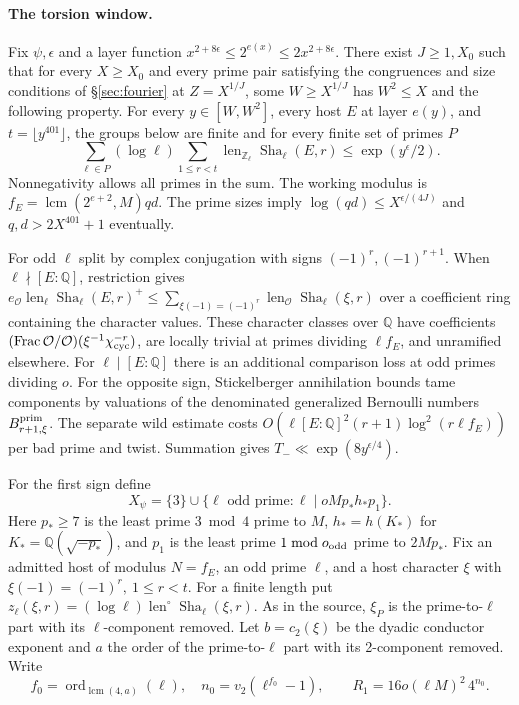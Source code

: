 \documentclass[letterpaper,11pt]{article}
\newcommand{\QQ}{\mathbb Q}
\newcommand{\ZZ}{\mathbb Z}
\newcommand{\Sha}{\operatorname{Sha}}
\newcommand{\len}{\operatorname{len}}
\newcommand{\ord}{\operatorname{ord}}
\begin{document}
\paragraph{The torsion window.}
Fix \(\psi,\epsilon\) and a layer function \(x^{2+8\epsilon}\le2^{e(x)}\le2x^{2+8\epsilon}\). There exist \(J\ge1,X_0\) such that for every \(X\ge X_0\) and every prime pair satisfying the congruences and size conditions of \S\ref{sec:fourier} at \(Z=X^{1/J}\), some \(W\ge X^{1/J}\) has \(W^2\le X\) and the following property. For every \(y\in[W,W^2]\), every host \(E\) at layer \(e(y)\), and \(t=\lfloor y^{401}\rfloor\), the groups below are finite and for every finite set of primes \(P\)
\begin{equation}\label{eq:sha}
 \sum_{\ell\in P}(\log\ell)\sum_{1\le r<t}\len_{\ZZ_\ell}\Sha_\ell(E,r)\le\exp(y^\epsilon/2).
\end{equation}
Nonnegativity allows all primes in the sum. The working modulus is \(f_E=\operatorname{lcm}(2^{e+2},M)qd\). The prime sizes imply \(\log(qd)\le X^{\epsilon/(4J)}\) and \(q,d>2X^{401}+1\) eventually.

For odd \(\ell\) split by complex conjugation with signs \((-1)^r,(-1)^{r+1}\). When \(\ell\nmid [E:\QQ]\), restriction gives
\(e_{\mathcal O}\len_\ell\Sha_\ell(E,r)^+\le\sum_{\xi(-1)=(-1)^r}\len_{\mathcal O}\Sha_\ell(\xi,r)\)
over a coefficient ring containing the character values. These character classes over \(\QQ\) have coefficients \((\operatorname{Frac}\mathcal O/\mathcal O)(\xi^{-1}\chi_{\rm cyc}^{-r})\), are locally trivial at primes dividing \(\ell f_E\), and unramified elsewhere. For \(\ell\mid[E:\QQ]\) there is an additional comparison loss at odd primes dividing \(o\). For the opposite sign, Stickelberger annihilation bounds tame components by valuations of the denominated generalized Bernoulli numbers \(B^{\rm prim}_{r+1,\xi}\). The separate wild estimate costs \(O(\ell[E:\QQ]^2(r+1)\log^2(r\ell f_E))\) per bad prime and twist. Summation gives \(T_-\ll\exp(8y^{\epsilon/4})\).

For the first sign define
\[
 X_\psi=\{3\}\cup\{\ell\text{ odd prime}:\ell\mid oMp_*h_*p_1\}.
\]
Here \(p_*\ge7\) is the least prime \(3\bmod4\) prime to \(M\), \(h_*=h(K_*)\) for \(K_*=\QQ(\sqrt{-p_*})\), and \(p_1\) is the least prime \(1\bmod o_{\rm odd}\) prime to \(2Mp_*\). Fix an admitted host of modulus \(N=f_E\), an odd prime \(\ell\), and a host character \(\xi\) with \(\xi(-1)=(-1)^r,\ 1\le r<t\). For a finite length put \(z_\ell(\xi,r)=(\log\ell)\len^\circ\Sha_\ell(\xi,r)\). As in the source, \(\xi_P\) is the prime-to-\(\ell\) part with its \(\ell\)-component removed. Let \(b=c_2(\xi)\) be the dyadic conductor exponent and \(a\) the order of the prime-to-\(\ell\) part with its 2-component removed. Write
\[
 f_0=\ord_{\operatorname{lcm}(4,a)}(\ell),\quad n_0=v_2(\ell^{f_0}-1),\qquad
 R_1=16o(\ell M)^2\,4^{n_0}.
\]
\end{document}
